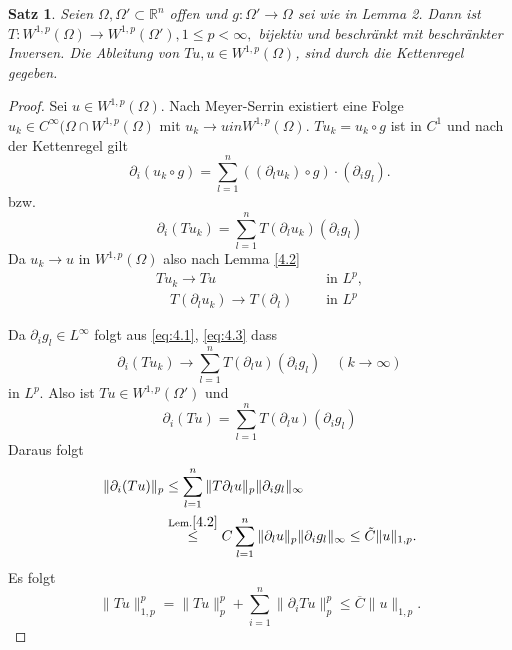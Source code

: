 \documentclass[
paper=a4,
bibtotocnumbered,
liststotocnumbered,
tablecaptionabove,
pointlessnumbers,
twoside,
openright,
10pt
]
{report}
\newtheorem{satz}[thm]{Satz}
\theoremstyle{definition}
\numberwithin{equation}{chapter}
\begin{document}
\begin{satz}
 Seien $\Omega, \Omega'\subset \mathbb R^n$ offen und $g: \Omega'\to \Omega$ sei wie in Lemma 2. 
 Dann ist $T: W^{1,p}(\Omega) \to W^{1,p}(\Omega'), 1\le p <\infty,$ bijektiv und beschränkt mit 
 beschränkter Inversen. Die Ableitung von $Tu, u \in W^{1,p}(\Omega)$, sind durch die Kettenregel gegeben.
\end{satz}
\begin{proof}
 Sei $u\in W^{1,p}(\Omega)$. Nach Meyer-Serrin existiert eine Folge $u_k \in C^\infty(\Omega \cap W^{1,p}(\Omega)$ mit $u_k \to u in W^{1,p}(\Omega)$. 
 $Tu_k=u_k \circ g$ ist in $C^1$ und nach der Kettenregel gilt
 \begin{equation}
  \partial_i (u_k \circ g) = \sum_{l=1}^n ((\partial_l u_k)\circ g)\cdot(\partial_i g_l).
 \end{equation}
 bzw.
 \begin{equation}\label{eq:4.1}
  \partial_i (Tu_k) = \sum_{l=1}^n T(\partial_l u_k) (\partial_i g_l)
 \end{equation}
Da $u_k \to u$ in $W^{1,p}(\Omega)$ also nach Lemma \eqref{4.2}
\begin{align}
 T u_k \to Tu &\ \quad \text{ in } L^p, \label{eq:4.2} \\ \quad T(\partial_l u_k) \to T(\partial_l) &\ \quad \text{ in } L^p \label{eq:4.3}
\end{align}

Da $\partial_i g_l \in L^\infty$ folgt aus \eqref{eq:4.1}, \eqref{eq:4.3} dass
\begin{equation}
 \partial_i(Tu_k) \to \sum_{l=1}^n T(\partial_l u) ( \partial_i g_l) \quad ( k\to \infty)
\end{equation}
in $L^p$. Also ist $Tu\in W^{1,p}(\Omega')$ und 
\begin{equation}
 \partial_i(Tu) = \sum_{l=1}^n T(\partial_l u) (\partial_i g_l)
\end{equation}
Daraus folgt
\begin{align*}
 \|\partial_i(Tu)\|_p &\le \sum_{l=1}^n \|T\partial_l u \|_p \| \partial_i g_l\|_\infty\\
 &\stackrel{\text{Lem.} \ref{4.2}}\le C \sum_{l=1}^n \| \partial_l u\|_p \| \partial_i g_l\|_\infty \le \tilde C \|u\|_{1,p}.
\end{align*}
Es folgt
\begin{equation}
 \|Tu\|_{1,p}^p = \|Tu\|_p^p + \sum_{i=1}^n \| \partial_i Tu\|_p^p \le \overline C \|u\|_{1,p}.
\end{equation}
\end{proof}
\end{document}
